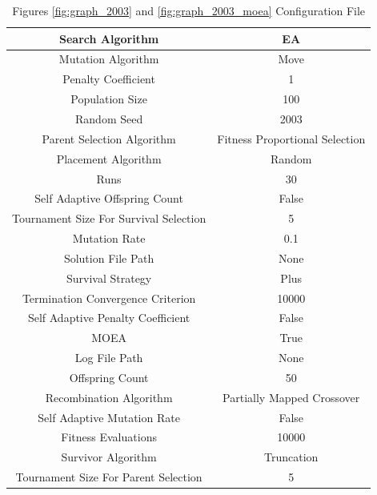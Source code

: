 \documentclass{standalone}
\begin{document}
\begin{table}[!htb]
	\centering
	\caption{Figures \ref{fig:graph_2003} and \ref{fig:graph_2003_moea} Configuration File}
	\label{tab:graph_2003}
	\begin{tabular}{| c | c |}
		\hline
		Search Algorithm		& EA		 \\
		\hline
		Mutation Algorithm		& Move		 \\
		\hline
		Penalty Coefficient		& 1		 \\
		\hline
		Population Size		& 100		 \\
		\hline
		Random Seed		& 2003		 \\
		\hline
		Parent Selection Algorithm		& Fitness Proportional Selection		 \\
		\hline
		Placement Algorithm		& Random		 \\
		\hline
		Runs		& 30		 \\
		\hline
		Self Adaptive Offspring Count		& False		 \\
		\hline
		Tournament Size For Survival Selection		& 5		 \\
		\hline
		Mutation Rate		& 0.1		 \\
		\hline
		Solution File Path		& None		 \\
		\hline
		Survival Strategy		& Plus		 \\
		\hline
		Termination Convergence Criterion		& 10000		 \\
		\hline
		Self Adaptive Penalty Coefficient		& False		 \\
		\hline
		MOEA		& True		 \\
		\hline
		Log File Path		& None		 \\
		\hline
		Offspring Count		& 50		 \\
		\hline
		Recombination Algorithm		& Partially Mapped Crossover		 \\
		\hline
		Self Adaptive Mutation Rate		& False		 \\
		\hline
		Fitness Evaluations		& 10000		 \\
		\hline
		Survivor Algorithm		& Truncation		 \\
		\hline
		Tournament Size For Parent Selection		& 5		 \\
		\hline
	\end{tabular}
\end{table}
\end{document}
